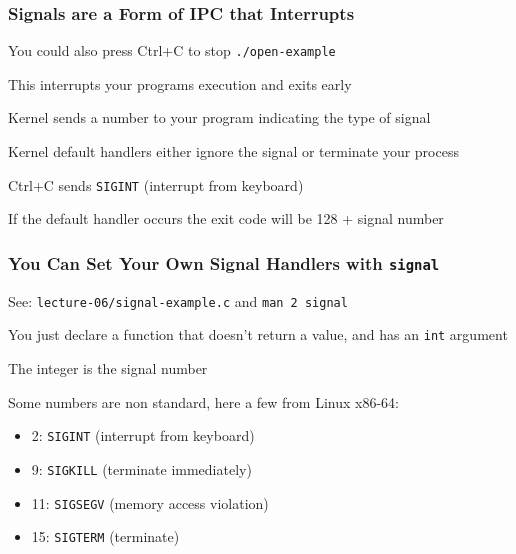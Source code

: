   \begin{frame}
    \frametitle{Signals are a Form of IPC that Interrupts}

    You could also press Ctrl+C to stop \texttt{./open-example}

    \hspace{2em} This interrupts your programs execution and exits early

    \vspace{2em}

    Kernel sends a number to your program indicating the type of signal
    
    \hspace{2em} Kernel default handlers either ignore the signal or terminate
    your process

    \vspace{2em}

    Ctrl+C sends \texttt{SIGINT} (interrupt from keyboard)

    \vspace{2em}

    If the default handler occurs the exit code will be 128 + signal number
  \end{frame}

  \begin{frame}
    \frametitle{You Can Set Your Own Signal Handlers with \texttt{signal}}

    See: \texttt{lecture-06/signal-example.c} and \texttt{man 2 signal}

    \vspace{2em}

    You just declare a function that doesn't return a value, and has an \texttt{int} argument

    \hspace{2em} The integer is the signal number

    \vspace{2em}

    Some numbers are non standard, here a few from Linux x86-64:
    \begin{itemize}
      \item 2: \texttt{SIGINT} (interrupt from keyboard)
      \item 9: \texttt{SIGKILL} (terminate immediately)
      \item 11: \texttt{SIGSEGV} (memory access violation)
      \item 15: \texttt{SIGTERM} (terminate)
    \end{itemize}
  \end{frame}

